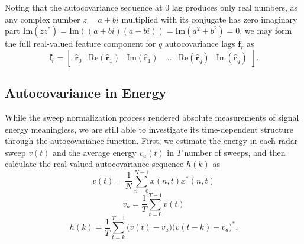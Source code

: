 Noting that the autocovariance sequence at 0 lag produces only real numbers, as any complex number $z = a + bi$ multiplied with its conjugate has zero imaginary part $\text{Im}(zz^*) = \text{Im}((a + bi)(a - bi)) = \text{Im}(a^2 + b^2) = 0$, we may form the full real-valued feature component for $q$ autocovariance lags $\mathbf{f}_{r}$ as
\begin{equation}
	\mathbf{f}_{r} = 
	\begin{bmatrix}
		\hat{\mathbf{r}}_{0}  & \text{Re}(\hat{\mathbf{r}}_{1} ) & \text{Im}(\hat{\mathbf{r}}_{1} ) & ... & \text{Re}(\hat{\mathbf{r}}_{q} ) & \text{Im}(\hat{\mathbf{r}}_{q} )
	\end{bmatrix}.
\end{equation}





\subsection{Autocovariance in Energy}

While the sweep normalization process rendered absolute measurements of signal energy meaningless, we are still able to investigate its time-dependent structure through the autocovariance function. First, we estimate the energy in each radar sweep $v(t)$ and the average energy $v_a(t)$ in $T$ number of sweeps, and then calculate the real-valued autocovariance sequence $h(k)$ as 
\begin{equation}
	v(t) = \frac{1}{N}\sum_{n=0}^{N-1}x(n,t)x^*(n,t)
\end{equation}
\begin{equation} 
	v_a = \frac{1}{T}\sum_{t=0}^{T-1}v(t)
\end{equation}
\begin{equation}
	h(k) = \frac{1}{T}\sum_{t=k}^{T-1}\big(v(t) - v_a\big)\big(v(t-k) - v_a\big)^*.
\end{equation}

